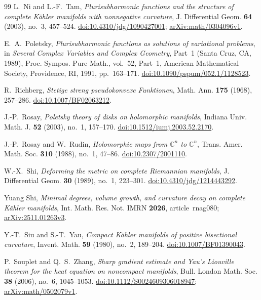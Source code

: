 \documentclass[11pt]{article}
\theoremstyle{definition}
\theoremstyle{remark}
\numberwithin{equation}{section}
\begin{document}
\begin{thebibliography}{99}
L.~Ni and L.-F.~Tam,
\emph{Plurisubharmonic functions and the structure of complete
K\"ahler manifolds with nonnegative curvature},
J. Differential Geom. \textbf{64} (2003), no.~3, 457--524.
\href{https://doi.org/10.4310/jdg/1090427001}
{doi:10.4310/jdg/1090427001};
\href{https://arxiv.org/abs/math/0304096v1}{arXiv:math/0304096v1}.

E.~A.~Poletsky,
\emph{Plurisubharmonic functions as solutions of variational problems},
in \emph{Several Complex Variables and Complex Geometry}, Part~1
(Santa Cruz, CA, 1989),
Proc. Sympos. Pure Math., vol.~52, Part~1,
American Mathematical Society, Providence, RI, 1991, pp.~163--171.
\href{https://doi.org/10.1090/pspum/052.1/1128523}
{doi:10.1090/pspum/052.1/1128523}.

R.~Richberg,
\emph{Stetige streng pseudokonvexe Funktionen},
Math. Ann. \textbf{175} (1968), 257--286.
\href{https://doi.org/10.1007/BF02063212}{doi:10.1007/BF02063212}.

J.-P.~Rosay,
\emph{Poletsky theory of disks on holomorphic manifolds},
Indiana Univ. Math. J. \textbf{52} (2003), no.~1, 157--170.
\href{https://doi.org/10.1512/iumj.2003.52.2170}
{doi:10.1512/iumj.2003.52.2170}.

J.-P.~Rosay and W.~Rudin,
\emph{Holomorphic maps from $\mathbb C^n$ to $\mathbb C^n$},
Trans. Amer. Math. Soc. \textbf{310} (1988), no.~1, 47--86.
\href{https://doi.org/10.2307/2001110}{doi:10.2307/2001110}.

W.-X.~Shi,
\emph{Deforming the metric on complete Riemannian manifolds},
J. Differential Geom. \textbf{30} (1989), no.~1, 223--301.
\href{https://doi.org/10.4310/jdg/1214443292}
{doi:10.4310/jdg/1214443292}.

Yuang Shi,
\emph{Minimal degrees, volume growth, and curvature decay on complete
K\"ahler manifolds},
Int. Math. Res. Not. IMRN \textbf{2026}, article~rnag080;
\href{https://arxiv.org/abs/2511.01263v3}{arXiv:2511.01263v3}.

Y.-T.~Siu and S.-T.~Yau,
\emph{Compact K\"ahler manifolds of positive bisectional curvature},
Invent. Math. \textbf{59} (1980), no.~2, 189--204.
\href{https://doi.org/10.1007/BF01390043}{doi:10.1007/BF01390043}.

P.~Souplet and Q.~S.~Zhang,
\emph{Sharp gradient estimate and Yau's Liouville theorem for the heat
equation on noncompact manifolds},
Bull. London Math. Soc. \textbf{38} (2006), no.~6, 1045--1053.
\href{https://doi.org/10.1112/S0024609306018947}
{doi:10.1112/S0024609306018947};
\href{https://arxiv.org/abs/math/0502079v1}{arXiv:math/0502079v1}.


\end{thebibliography}
\end{document}
